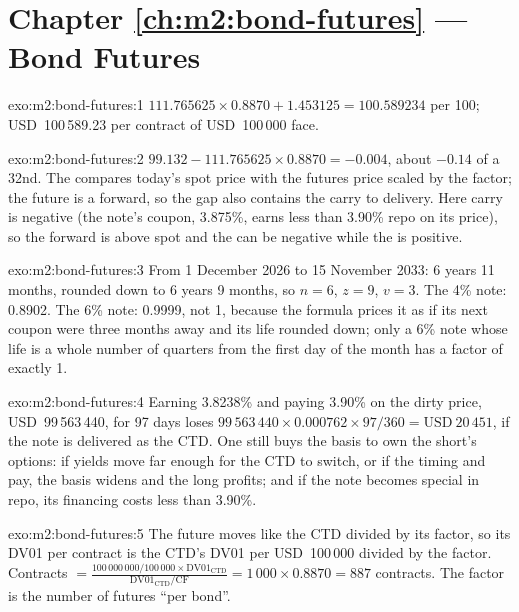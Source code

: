 \section*{Chapter \ref{ch:m2:bond-futures} --- Bond Futures}

\begin{solution}{exo:m2:bond-futures:1}
$111.765625 \times 0.8870 + 1.453125 = 100.589234$ per 100; USD~100\,589.23 per
contract of USD~100\,000 face.
\end{solution}

\begin{solution}{exo:m2:bond-futures:2}
$99.132 - 111.765625 \times 0.8870 = -0.004$, about $-0.14$ of a 32nd. The  compares today's spot price with the futures price scaled by the factor;
the future is a forward, so the gap also contains the carry to delivery.
Here carry is negative (the note's coupon, 3.875\%, earns less than 3.90\% repo
on its price), so the forward is above spot and the  can be
negative while the  is positive.
\end{solution}

\begin{solution}{exo:m2:bond-futures:3}
From 1 December 2026 to 15 November 2033: 6 years 11 months, rounded down to
6 years 9 months, so $n = 6$, $z = 9$, $v = 3$. The 4\% note: 0.8902. The 6\%
note: 0.9999, not 1, because the formula prices it as if its next coupon were
three months away and its life rounded down; only a 6\% note whose life is a
whole number of quarters from the first day of the month has a factor of
exactly 1.
\end{solution}

\begin{solution}{exo:m2:bond-futures:4}
Earning 3.8238\% and paying 3.90\% on the dirty price, USD~99\,563\,440, for 97
days loses $99\,563\,440 \times 0.000762 \times 97/360 = \text{USD}~20\,451$, if the
note is delivered as the CTD. One still buys the basis to own the short's options:
if yields move far enough for the CTD to switch, or if the timing and  pay, the basis widens and the long profits; and if the note becomes
special in repo, its financing costs less than 3.90\%.
\end{solution}

\begin{solution}{exo:m2:bond-futures:5}
The future moves like the CTD divided by its factor, so its DV01 per contract
is the CTD's DV01 per USD~100\,000 divided by the factor. Contracts
$= \frac{100\,000\,000/100\,000 \times \mathrm{DV01}_{\text{CTD}}}{\mathrm{DV01}_{\text{CTD}}/\mathrm{CF}} = 1\,000 \times 0.8870 = 887$
contracts. The factor is the number of futures ``per bond''.
\end{solution}

